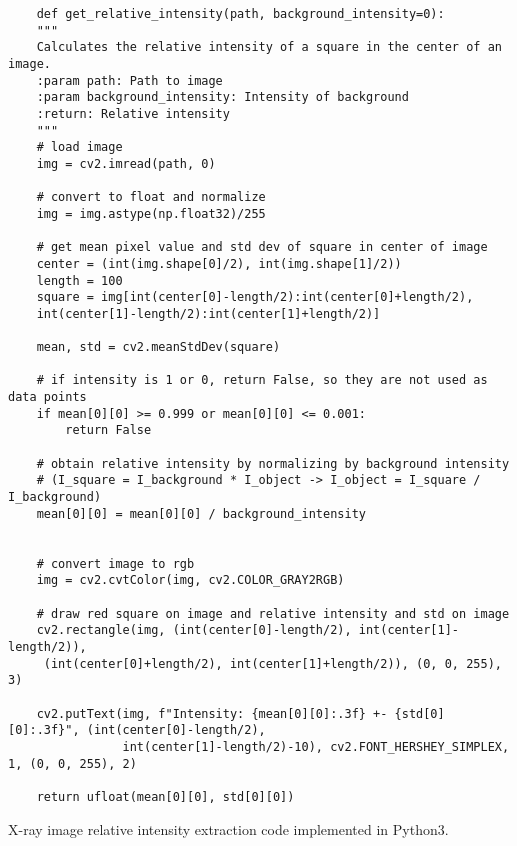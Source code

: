 \begin{code}
\begin{verbatim}
    def get_relative_intensity(path, background_intensity=0):
    """
    Calculates the relative intensity of a square in the center of an image.
    :param path: Path to image
    :param background_intensity: Intensity of background
    :return: Relative intensity
    """
    # load image
    img = cv2.imread(path, 0)

    # convert to float and normalize
    img = img.astype(np.float32)/255

    # get mean pixel value and std dev of square in center of image
    center = (int(img.shape[0]/2), int(img.shape[1]/2))
    length = 100
    square = img[int(center[0]-length/2):int(center[0]+length/2), 
    int(center[1]-length/2):int(center[1]+length/2)]

    mean, std = cv2.meanStdDev(square)

    # if intensity is 1 or 0, return False, so they are not used as data points
    if mean[0][0] >= 0.999 or mean[0][0] <= 0.001:
        return False

    # obtain relative intensity by normalizing by background intensity
    # (I_square = I_background * I_object -> I_object = I_square / I_background)
    mean[0][0] = mean[0][0] / background_intensity


    # convert image to rgb
    img = cv2.cvtColor(img, cv2.COLOR_GRAY2RGB)

    # draw red square on image and relative intensity and std on image
    cv2.rectangle(img, (int(center[0]-length/2), int(center[1]-length/2)),
     (int(center[0]+length/2), int(center[1]+length/2)), (0, 0, 255), 3)

    cv2.putText(img, f"Intensity: {mean[0][0]:.3f} +- {std[0][0]:.3f}", (int(center[0]-length/2),
                int(center[1]-length/2)-10), cv2.FONT_HERSHEY_SIMPLEX, 1, (0, 0, 255), 2)

    return ufloat(mean[0][0], std[0][0])
\end{verbatim}
\caption{X-ray image relative intensity extraction code implemented in Python3.}
\label{code::extractionCode}
\end{code}